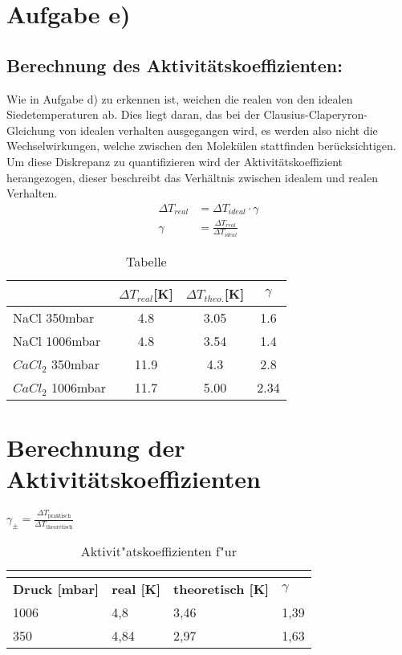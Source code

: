 \section{Aufgabe e)}
\subsection{Berechnung des Aktivitätskoeffizienten:}
Wie in Aufgabe d) zu erkennen ist, weichen die realen von den idealen
Siedetemperaturen ab. Dies liegt daran, das bei der Clausius-Claperyron-Gleichung von idealen verhalten
ausgegangen wird, es werden also nicht die Wechselwirkungen, welche zwischen den Molekülen stattfinden berücksichtigen.
Um diese Diskrepanz zu quantifizieren wird der Aktivitätskoeffizient herangezogen, dieser beschreibt das Verhältnis
zwischen idealem und realen Verhalten.
\begin{align*}
	\Delta T_{real} & = \Delta T_{ideal} \cdot \gamma            \\
	\gamma          & = \frac{\Delta T_{real}}{\Delta T_{ideal}}
\end{align*}

\begin{table}[H]
	\centering
	\caption{Tabelle}
	\begin{tabular}{lccc}
		\toprule
		                  & $\Delta T_{real}$[K] & $\Delta T_{theo.}$[K] & $\gamma$ \\
		\midrule
		NaCl 350mbar      & 4.8                  & 3.05                  & 1.6      \\
		NaCl 1006mbar     & 4.8                  & 3.54                  & 1.4      \\
		$CaCl_2$ 350mbar  & 11.9                 & 4.3                   & 2.8      \\
		$CaCl_2$ 1006mbar & 11.7                 & 5.00                  & 2.34     \\
		\bottomrule
	\end{tabular}
\end{table}


 \section*{Berechnung der Aktivitätskoeffizienten}
	
	$\gamma_{\pm} = \frac{\Delta T_{\text{praktisch}}}{\Delta T_{\text{theoretisch}}}$ \\
	\newline
	\begin{table}[H]
		\caption{Aktivit"atskoeffizienten f"ur }
		\label{tab: Aktivitätskoeffizient_NaCl}
			\begin{tabular}{|l|l|l|l|}
			\hline
			\multicolumn{4}{|c|}{\textbf{\ce{NaCl}}} \\\hline
			\textbf{Druck [mbar]}	 &	\textbf{real [K]}	&	\textbf{theoretisch [K]}	&	\textbf{$\gamma$} \\\hline
			1006	&	4,8		&	3,46	&	1,39 \\
			350		&	4,84	&	2,97	&	1,63 \\\hline
			\end{tabular}
	\end{table} 	


